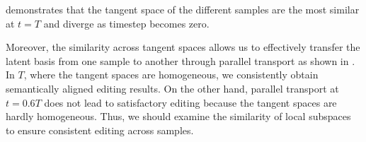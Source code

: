 


 demonstrates that the tangent space of the different samples are the most similar at $t=T$ and diverge as {timestep becomes} zero. 


Moreover, the similarity across tangent space{s} allows us to effectively transfer the latent basis from one {sample} to another through parallel transport as shown in .
In $T$, {where the tangent spaces are homogeneous},
we consistently obtain semantically aligned editing results. 
{On the other hand, parallel transport at $t=0.6T$ does not lead to satisfactory editing because the tangent spaces are hardly homogeneous. Thus, we should examine the similarity of local subspaces to ensure consistent editing across samples.}




